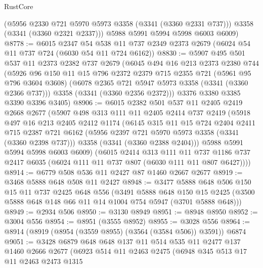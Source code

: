 \begin{lexlean}{RustCore}
\begin{coremodule}
        (@5956 @2330 @721 @5970 @5973 @3358 (@3341 (@3360 @2331 @737)))
        @3358
        (@3341 (@3360 @2321 @2337)))
      @5988
      @5991
      @5994
      @5998
      @6003
      @6009)
@8778 := @6015
    @2347
    @54
    @538
    @11
    @737
    @2349
    @2373
    @2679
    (@6024 @54 @11 @737 @724 (@6030 @54 @11 @724 @6162))
@8830 := @5907
    @495
    @501
    @537
    @11
    @2373
    @2382
    @737
    @2679
    (@6045
      @494
      @16
      @213
      @2373
      @2380
      @744
      (@5926
        @96
        @150
        @11
        @15
        @796
        @2372
        @2379
        @715
        @2355
        @721
        (@5961 @95 @796 @3604 @3608)
        (@6078 @2365 @721 @5947 @5973 @3358 (@3341 (@3360 @2366 @737)))
        @3358
        (@3341 (@3360 @2356 @2372)))
      @3376
      @3380
      @3385
      @3390
      @3396
      @3405)
@8906 := @6015
    @2382
    @501
    @537
    @11
    @2405
    @2419
    @2668
    @2677
    (@5907
      @498
      @313
      @111
      @11
      @2405
      @2414
      @737
      @2419
      (@5918
        @497
        @16
        @213
        @2405
        @2412
        @1174
        (@6145
          @315
          @11
          @15
          @724
          @2404
          @2411
          @715
          @2387
          @721
          @6162
          (@5956 @2397 @721 @5970 @5973 @3358 (@3341 (@3360 @2398 @737)))
          @3358
          (@3341 (@3360 @2388 @2404)))
        @5988
        @5991
        @5994
        @5998
        @6003
        @6009)
      (@6015
        @2414
        @313
        @111
        @11
        @737
        @1186
        @737
        @2417
        @6035
        (@6024 @111 @11 @737 @807 (@6030 @111 @11 @807 @6427))))
@8914 := @6779 @508 @536 @11 @2427 @87 @1460 @2667 @2677
@8919 := @3468 @5888 @648 @508 @11 @2427
@8948 := @3477
    @5888
    @648
    @506
    @150
    @15
    @11
    @737
    @2425
    @648
    @556
    (@3491
      @5888
      @648
      @150
      @15
      @2425
      (@3500 @5888 @648 @148 @66 @11 @14 @1004 @754 @5947 (@3701 @5888 @648)))
@8949 := @2934 @506
@8950 := @3130 @8949
@8951 := @8948 @8950
@8952 := @3004 @556
@8954 := @8951 (@3555 @8952)
@8955 := @3028 @556
@8964 := @8914 (@8919 (@8954 (@3559 @8955) (@3564 (@3584 @506)) @3591)) @6874
@9051 := @3428
    @6879
    @648
    @648
    @137
    @11
    @514
    @535
    @11
    @2477
    @137
    @1460
    @2666
    @2677
    (@6923
      @514
      @11
      @2463
      @2475
      (@6948
        @345
        @513
        @17
        @11
        @2463
        @2473
        @1315

\end{coremodule}
\end{lexlean}
